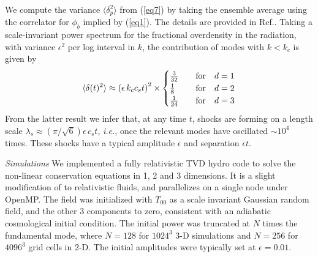 \documentclass[prl,aps,10pt,twocolumn,showkeys,nofootinbib]{revtex4-1}
\def\bena{\begin{eqnarray}}
\def\eena{\end{eqnarray}}
\begin{document}
We compute the variance $\langle \delta_{p}^2 \rangle$ from (\ref{eq7}) by taking the ensemble average using the correlator for $\phi_b$ implied by (\ref{eq1}). The details are provided in Ref.\cite{penturoklong}. Taking a scale-invariant power spectrum for the fractional overdensity in the radiation, with variance $\epsilon^2$ per log interval in $k$, the contribution of modes with $k<k_c$ is given by 
\bena
 \langle \delta(t)^2\rangle \approx\left(\epsilon \,k_c c_s t\right)^2\times
  \begin{cases}
   {3\over 32}  & \quad  {\rm for} \quad d=1    \cr
  {1\over 8}     &\quad {\rm for} \quad d=2    \cr
  {1\over 24}     & \quad  {\rm for} \quad d=3   \cr
  \end{cases}
\label{eq8}
\eena
From the latter result we infer that, at any time $t$, shocks are forming on a length scale $\lambda_s\approx (\pi/\sqrt{6}) \epsilon \, c_s t$, {\it i.e.}, once the relevant modes have oscillated $\sim 10^4$ times. These shocks have a typical amplitude $\epsilon$ and separation $\epsilon t$. 

{\it Simulations} We implemented a fully relativistic TVD hydro code to solve the non-linear conservation equations in 1, 2 and 3 dimensions. It is a slight modification of \cite{trac} to relativistic fluids, and parallelizes on a single node under OpenMP.  The field was initialized with $T_{00}$ as a scale invariant Gaussian random field, and the other 3 components to zero, consistent with an adiabatic cosmological initial condition.  The initial power was truncated at $N$ times the fundamental mode, where $N=128$ for $1024^3$ 3-D simulations and $N=256$ for $4096^3$ grid cells in 2-D. The initial amplitudes were typically set at $\epsilon=0.01$.
\end{document}
